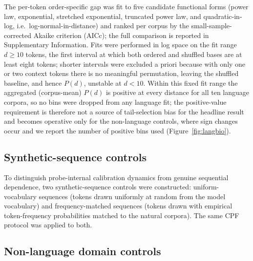\documentclass[11pt]{article}
\begin{document}
The per-token order-specific gap was fit to five candidate functional forms (power law,
exponential, stretched exponential, truncated power law, and quadratic-in-log,
i.e.\ log-normal-in-distance) and ranked per corpus by the small-sample-corrected Akaike
criterion (AICc); the full comparison is reported in Supplementary Information. Fits were performed
in log space on the fit range $d \geq 10$ tokens, the first interval at which both ordered and
shuffled bases are at least eight tokens; shorter intervals were excluded a priori because with
only one or two context tokens there is no meaningful permutation, leaving the shuffled baseline,
and hence $P(d)$, unstable at $d < 10$. Within this fixed fit range the aggregated (corpus-mean)
$P(d)$ is positive at every distance for all ten language corpora, so no bins were dropped from any
language fit; the positive-value requirement is therefore not a source of tail-selection bias for
the headline result and becomes operative only for the non-language controls, where sign changes
occur and we report the number of positive bins used (Figure~\ref{fig:langbio}).

\subsection{Synthetic-sequence controls}

To distinguish probe-internal calibration dynamics from genuine sequential dependence, two
synthetic-sequence controls were constructed: uniform-vocabulary sequences (tokens drawn uniformly
at random from the model vocabulary) and frequency-matched sequences (tokens drawn with empirical
token-frequency probabilities matched to the natural corpora). The same CPF
protocol was applied to both.

\subsection{Non-language domain controls}
\end{document}
